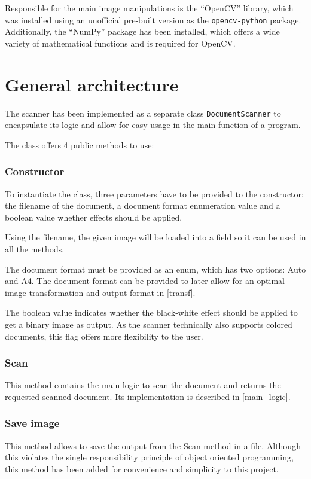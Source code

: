 Responsible for the main image manipulations is the \enquote{OpenCV} library, which was installed using an unofficial pre-built version as the \texttt{opencv-python} package. \cite{pip_opencv} Additionally, the \enquote{NumPy} package has been installed, which offers a wide variety of mathematical functions and is required for OpenCV. \cite{pip_numpy}

\section{General architecture}
The scanner has been implemented as a separate class \texttt{DocumentScanner} to encapsulate its logic and allow for easy usage in the main function of a program.

The class offers 4 public methods to use:

\subsubsection*{Constructor}
To instantiate the class, three parameters have to be provided to the constructor: the filename of the document, a document format enumeration value and a boolean value whether effects should be applied.

Using the filename, the given image will be loaded into a field so it can be used in all the methods.

The document format must be provided as an enum, which has two options: Auto and A4. The document format can be provided to later allow for an optimal image transformation and output format in \autoref{transf}.

The boolean value indicates whether the black-white effect should be applied to get a binary image as output. As the scanner technically also supports colored documents, this flag offers more flexibility to the user.

\subsubsection*{Scan}
This method contains the main logic to scan the document and returns the requested scanned document. Its implementation is described in \autoref{main_logic}.

\subsubsection*{Save image}
This method allows to save the output from the Scan method in a file. Although this violates the single responsibility principle of object oriented programming, this method has been added for convenience and simplicity to this project. 

